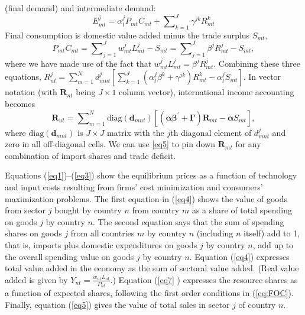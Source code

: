 \documentclass[12pt]{article}
\begin{document}
(final demand) and intermediate demand: 
\begin{equation*}
E_{mt}^{j}=\alpha _{t}^{j}P_{mt}C_{mt}+\sum\nolimits_{k=1}^{J}\gamma
^{jk}R_{mt}^{k}
\end{equation*}%
Final consumption is domestic value added minus the trade surplus $S_{mt}$, 
\begin{equation*}
P_{mt}C_{mt}=\sum\nolimits_{j=1}^{J}w_{mt}^{j}L_{mt}^{j}-S_{mt}=\sum%
\nolimits_{j=1}^{J}\beta ^{j}R_{mt}^{j}-S_{mt},
\end{equation*}%
where we have made use of the fact that $w_{mt}^{j}L_{mt}^{j}=\beta
^{j}R_{mt}^{j}$. Combining these three equations, $R_{nt}^{j}=%
\sum_{m=1}^{N}d_{mnt}^{j}\left[ \sum_{k=1}^{J}(\alpha _{t}^{j}\beta
^{k}+\gamma ^{jk})R_{mt}^{k}-\alpha _{t}^{j}S_{mt}\right] $. In vector
notation (with $\mathbf{R}_{nt}$ being $J\times 1$ column vector),
international income accounting becomes 
\begin{equation}
\mathbf{R}_{nt}=\sum\nolimits_{m=1}^{N}\text{diag}(\mathbf{d}_{mnt})[(%
\boldsymbol{\alpha \beta }^{\prime }+\boldsymbol{\Gamma })\mathbf{R}_{mt}-%
\boldsymbol{\alpha }S_{mt}],  \label{eq5}
\end{equation}%
where $\text{diag}(\mathbf{d}_{mnt})$ is $J\times J$ matrix with the $j$th
diagonal element of $d_{mnt}^{j}$ and zero in all off-diagonal cells. We can
use \eqref{eq5} to pin down $\mathbf{R}_{mt}$ for any combination of import
shares and trade deficit. 

Equations (\ref{eq1})--(\ref{eq3}) show the equilibrium prices as a function
of technology and input costs resulting from firms' cost minimization and
consumers' maximization problems. The first equation in (\ref{eq4}) shows
the value of goods from sector $j$ bought by country $n$ from country $m$ as
a share of total spending on goods $j$ by country $n.$ The second equation
says that the sum of spending shares on goods $j$ from all countries $m$ by
country $n$ (including $n$ itself) add to 1, that is, imports plus domestic
expenditures on goods $j$ by country $n$, add up to the overall spending
value on goods $j$ by country $n.$ Equation (\ref{eq4}) expresses total
value added in the economy as the sum of sectoral value added. (Real value
added is given by $Y_{nt}=\frac{w_{nt}L_{nt}}{P_{nt}}$.) Equation (\ref{eq7}%
) expresses the resource shares as a function of expected shares, following
the first order conditions in (\ref{eq:FOC}). Finally, equation (\ref{eq5})
gives the value of total sales in sector $j$ of country $n$. 
\end{document}
